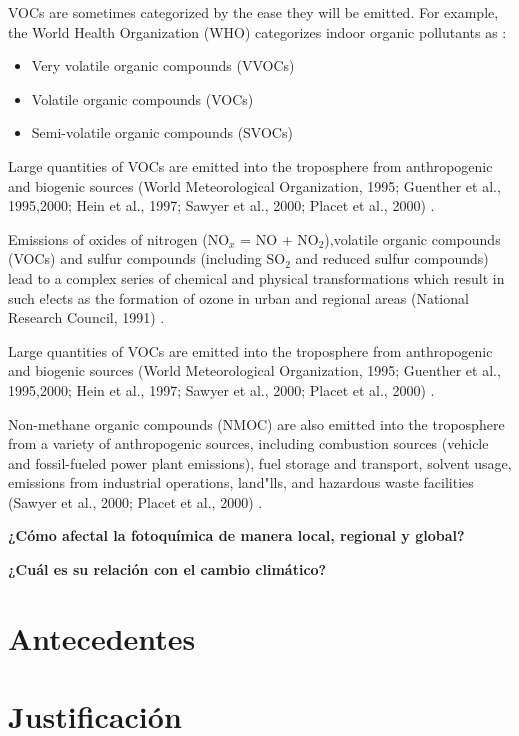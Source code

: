 \documentclass[10pt]{article}
\begin{document}
VOCs are sometimes categorized by the ease they will be emitted. For example, the World Health Organization (WHO) categorizes indoor organic pollutants as \cite{epavoc}:

\begin{itemize}
    \item Very volatile organic compounds (VVOCs)
    \item Volatile organic compounds (VOCs)
    \item Semi-volatile organic compounds (SVOCs)
\end{itemize}

Large quantities of VOCs are emitted into the troposphere from anthropogenic and biogenic sources (World Meteorological Organization, 1995; Guenther et al., 1995,2000; Hein et al., 1997; Sawyer et al., 2000; Placet et al., 2000) \cite{atkinson-2000}.

Emissions of oxides of nitrogen (NO$_{x}$ = NO + NO$_{2}$),volatile organic compounds (VOCs) and sulfur compounds (including SO$_{2}$ and reduced sulfur compounds) lead to a complex series of chemical and physical transformations which result in such e!ects as the formation of ozone in urban and regional areas (National Research Council, 1991) \cite{atkinson-2000}.

Large quantities of VOCs are emitted into the troposphere from anthropogenic and biogenic sources (World Meteorological Organization, 1995; Guenther et al., 1995,2000; Hein et al., 1997; Sawyer et al., 2000; Placet et al., 2000) \cite{atkinson-2000}.

Non-methane organic compounds (NMOC) are also emitted into the troposphere from a variety of anthropogenic sources, including combustion sources (vehicle and fossil-fueled power plant emissions), fuel storage and transport, solvent usage, emissions from industrial operations, land"lls, and hazardous waste facilities (Sawyer et al., 2000; Placet et al., 2000) \cite{atkinson-2000}.


\bf{¿Cómo afectal la fotoquímica de manera local, regional y global?}

\bf{¿Cuál es su relación con el cambio climático?}

\section{Antecedentes}\label{sec:2}


\section{Justificación}\label{sec:3}



\end{document}
